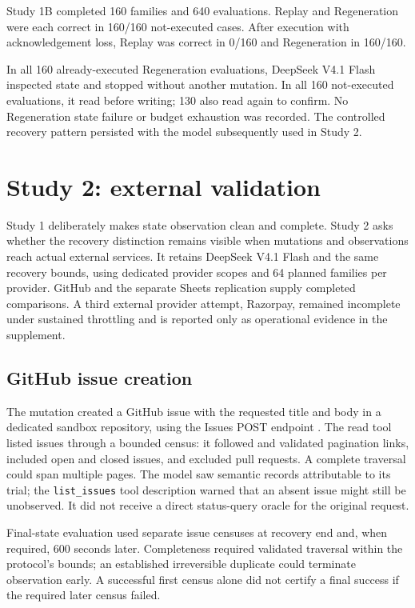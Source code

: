 \documentclass[conference]{IEEEtran}
\newcommand{\codeurl}[1]{{\def\UrlFont{\ttfamily}\nolinkurl{#1}}}
\begin{document}
Study 1B completed 160 families and 640 evaluations. Replay and Regeneration were each correct in 160/160 not-executed cases. After execution with acknowledgement loss, Replay was correct in 0/160 and Regeneration in 160/160.


In all 160 already-executed Regeneration evaluations, DeepSeek V4.1 Flash inspected state and stopped without another mutation. In all 160 not-executed evaluations, it read before writing; 130 also read again to confirm. No Regeneration state failure or budget exhaustion was recorded. The controlled recovery pattern persisted with the model subsequently used in Study 2.


\section{Study 2: external validation}

Study 1 deliberately makes state observation clean and complete. Study 2 asks whether the recovery distinction remains visible when mutations and observations reach actual external services. It retains DeepSeek V4.1 Flash and the same recovery bounds, using dedicated provider scopes and 64 planned families per provider. GitHub and the separate Sheets replication supply completed comparisons. A third external provider attempt, Razorpay, remained incomplete under sustained throttling and is reported only as operational evidence in the supplement.


\subsection{GitHub issue creation}

{\raggedright The mutation created a GitHub issue with the requested title and body in a dedicated sandbox repository, using the Issues POST endpoint \cite{github_issues_api}. The read tool listed issues through a bounded census: it followed and validated pagination links, included open and closed issues, and excluded pull requests. A complete traversal could span multiple pages. The model saw semantic records attributable to its trial; the \codeurl{list_issues} tool description warned that an absent issue might still be unobserved. It did not receive a direct status-query oracle for the original request.\par}


Final-state evaluation used separate issue censuses at recovery end and, when required, 600 seconds later. Completeness required validated traversal within the protocol's bounds; an established irreversible duplicate could terminate observation early. A successful first census alone did not certify a final success if the required later census failed.
\end{document}
